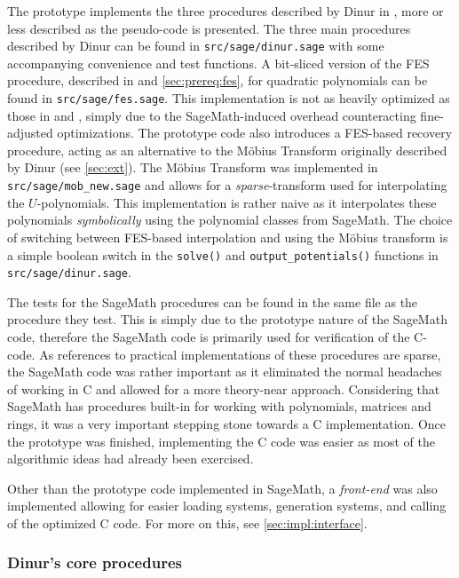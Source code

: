 The prototype implements the three procedures described by Dinur in \cite{eurocrypt-2021-30841}, more or less described as the pseudo-code is presented. The three main procedures described by Dinur can be found in \texttt{src/sage/dinur.sage} with some accompanying convenience and test functions. A bit-sliced version of the FES procedure, described in \cite{ches-2010-23990} and \cref{sec:prereq:fes}, for quadratic polynomials can be found in \texttt{src/sage/fes.sage}. This implementation is not as heavily optimized as those in \cite{ches-2010-23990} and \cite{cryptoeprint:2013/436}, simply due to the SageMath-induced overhead counteracting fine-adjusted optimizations. The prototype code also introduces a FES-based recovery procedure, acting as an alternative to the Möbius Transform originally described by Dinur (see \cref{sec:ext}). The Möbius Transform was implemented in \texttt{src/sage/mob\_new.sage} and allows for a \textit{sparse}-transform used for interpolating the $U$-polynomials. This implementation is rather naive as it interpolates these polynomials \textit{symbolically} using the polynomial classes from SageMath. The choice of switching between FES-based interpolation and using the Möbius transform is a simple boolean switch in the \texttt{solve()} and \texttt{output\_potentials()} functions in \texttt{src/sage/dinur.sage}.

The tests for the SageMath procedures can be found in the same file as the procedure they test. This is simply due to the prototype nature of the SageMath code, therefore the SageMath code is primarily used for verification of the C-code. As references to practical implementations of these procedures are sparse, the SageMath code was rather important as it eliminated the normal headaches of working in C and allowed for a more theory-near approach. Considering that SageMath has procedures built-in for working with polynomials, matrices and rings, it was a very important stepping stone towards a C implementation. Once the prototype was finished, implementing the C code was easier as most of the algorithmic ideas had already been exercised.

Other than the prototype code implemented in SageMath, a \textit{front-end} was also implemented allowing for easier loading systems, generation systems, and calling of the optimized C code. For more on this, see \cref{sec:impl:interface}.

\subsubsection{Dinur's core procedures}
